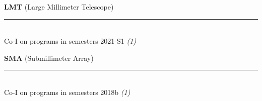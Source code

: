 \documentclass[11pt]{article}
\makeatletter
\def\vhrulefill#1{\leavevmode\leaders\hrule\@height#1\hfill \kern\z@}
\makeatother
\begin{document}

{\bf LMT} {\small (Large Millimeter Telescope)} \vhrulefill{0.5pt}\\
Co-I on programs in semesters 2021-S1 {\em(1)}\medskip


{\bf SMA} {\small (Submillimeter Array)} \vhrulefill{0.5pt}\\
Co-I on programs in semesters 2018b {\em(1)}\medskip
\end{document}
